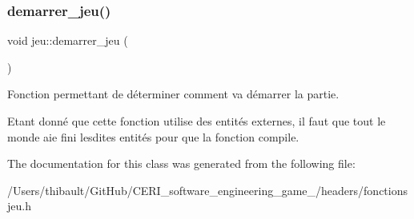 \subsubsection{\texorpdfstring{demarrer\+\_\+jeu()}{demarrer\_jeu()}}
{\footnotesize\ttfamily void jeu\+::demarrer\+\_\+jeu (\begin{DoxyParamCaption}{ }\end{DoxyParamCaption})}



Fonction permettant de déterminer comment va démarrer la partie. 

Etant donné que cette fonction utilise des entités externes, il faut que tout le monde aie fini lesdites entités pour que la fonction compile. 

The documentation for this class was generated from the following file\+:\begin{DoxyCompactItemize}
\item 
/\+Users/thibault/\+Git\+Hub/\+C\+E\+R\+I\+\_\+software\+\_\+engineering\+\_\+game\+\_/headers/fonctionsjeu.\+h\end{DoxyCompactItemize}
